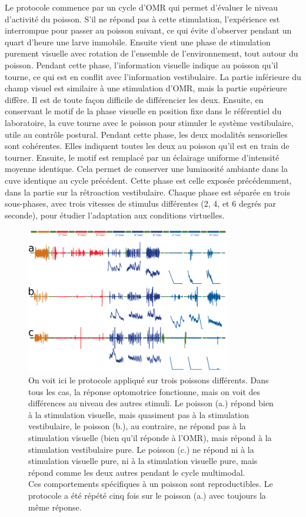 Le protocole commence par un cycle d'OMR qui permet d'évaluer le niveau d'activité du poisson. S'il ne répond pas à cette stimulation, l'expérience est interrompue pour passer au poisson suivant, ce qui évite d'observer pendant un quart d'heure une larve immobile. Ensuite vient une phase de stimulation purement visuelle avec rotation de l'ensemble de l'environnement, tout autour du poisson. Pendant cette phase, l'information visuelle indique au poisson qu'il tourne, ce qui est en conflit avec l'information vestibulaire. La partie inférieure du champ visuel est similaire à une stimulation d'OMR, mais la partie supérieure diffère. Il est de toute façon difficile de différencier les deux. Ensuite, en conservant le motif de la phase visuelle en position fixe dans le référentiel du laboratoire, la cuve tourne avec le poisson pour stimuler le système vestibulaire, utile au contrôle postural. Pendant cette phase, les deux modalités sensorielles sont cohérentes. Elles indiquent toutes les deux au poisson qu'il est en train de tourner. Ensuite, le motif est remplacé par un éclairage uniforme d'intensité moyenne identique. Cela permet de conserver une luminosité ambiante dans la cuve identique au cycle précédent. Cette phase est celle exposée précédemment, dans la partie sur la rétroaction vestibulaire. Chaque phase est séparée en trois sous-phases, avec trois vitesses de stimulus différentes (2, 4, et 6 degrés par seconde), pour étudier l'adaptation aux conditions virtuelles.

\begin{figure}
\centering
\includegraphics[width=0.8\textwidth]{./files/raw_data.svg.png}
\caption{
On voit ici le protocole appliqué sur trois poissons différents. Dans tous les cas, la réponse optomotrice fonctionne, mais on voit des différences au niveau des autres stimuli. Le poisson (a.) répond bien à la stimulation visuelle, mais quasiment pas à la stimulation vestibulaire, le poisson (b.), au contraire, ne répond pas à la stimulation visuelle (bien qu'il réponde à l'OMR), mais répond à la stimulation vestibulaire pure. Le poisson (c.) ne répond ni à la stimulation visuelle pure, ni à la stimulation visuelle pure, mais répond comme les deux autres pendant le cycle multimodal.
\\
Ces comportements spécifiques à un poisson sont reproductibles. Le protocole a été répété cinq fois sur le poisson (a.) avec toujours la même réponse.
}
\end{figure}

